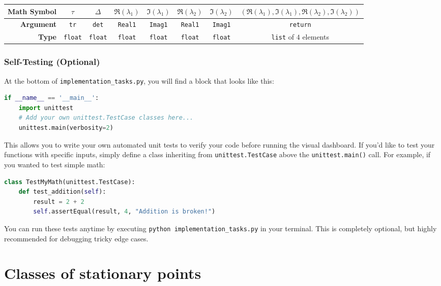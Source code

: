 \documentclass[11pt]{article}
\begin{document}
\begin{center}
\renewcommand{\arraystretch}{2.0}
\begin{tabular}{r | c | c | c | c | c | c | c}
\toprule
\textbf{Math Symbol} & $\tau$ & $\Delta$ & $\Re(\lambda_1)$ & $\Im(\lambda_1)$ & $\Re(\lambda_2)$ & $\Im(\lambda_2)$ & $(\Re(\lambda_1), \Im(\lambda_1), \Re(\lambda_2), \Im(\lambda_2))$ \\ \midrule
\textbf{Argument} & \lstinline|tr| & \lstinline|det| & \lstinline|Real1| & \lstinline|Imag1| & \lstinline|Real1| & \lstinline|Imag1| & \lstinline|return| \\ \midrule
\textbf{Type} & \lstinline|float| & \lstinline|float| & \lstinline|float| & \lstinline|float| & \lstinline|float| & \lstinline|float| & \lstinline|list| of $4$ elements \\
\bottomrule
\end{tabular}
\end{center}

\subsubsection*{Self-Testing (Optional)}
At the bottom of \lstinline|implementation_tasks.py|, you will find a block that looks like this:
\begin{lstlisting}[language=Python]
if __name__ == '__main__':
    import unittest
    # Add your own unittest.TestCase classes here...
    unittest.main(verbosity=2)
\end{lstlisting}
This allows you to write your own automated unit tests to verify your code before running the visual dashboard. If you'd like to test your functions with specific inputs, simply define a class inheriting from \lstinline|unittest.TestCase| above the \lstinline|unittest.main()| call. For example, if you wanted to test simple math:
\begin{lstlisting}[language=Python]
class TestMyMath(unittest.TestCase):
    def test_addition(self):
        result = 2 + 2
        self.assertEqual(result, 4, "Addition is broken!")
\end{lstlisting}
You can run these tests anytime by executing \lstinline|python implementation_tasks.py| in your terminal. This is completely optional, but highly recommended for debugging tricky edge cases.

\section*{Classes of stationary points}
\end{document}
